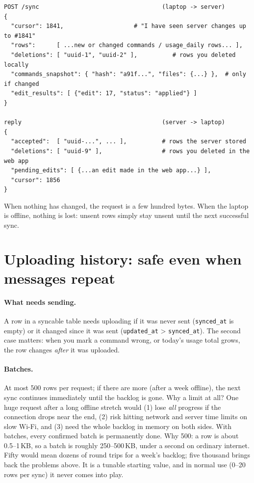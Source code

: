 \documentclass[11pt,a4paper]{article}
\begin{document}
\begin{lstlisting}
POST /sync                                   (laptop -> server)
{
  "cursor": 1841,                    # "I have seen server changes up to #1841"
  "rows":      [ ...new or changed commands / usage_daily rows... ],
  "deletions": [ "uuid-1", "uuid-2" ],          # rows you deleted locally
  "commands_snapshot": { "hash": "a91f...", "files": {...} },  # only if changed
  "edit_results": [ {"edit": 17, "status": "applied"} ]
}

reply                                        (server -> laptop)
{
  "accepted":  [ "uuid-...", ... ],          # rows the server stored
  "deletions": [ "uuid-9" ],                 # rows you deleted in the web app
  "pending_edits": [ {...an edit made in the web app...} ],
  "cursor": 1856
}
\end{lstlisting}

\noindent When nothing has changed, the request is a few hundred bytes. When the laptop is
offline, nothing is lost: unsent rows simply stay unsent until the next successful sync.

\section{Uploading history: safe even when messages repeat}

\paragraph{What needs sending.} A row in a syncable table needs uploading if it was never
sent (\texttt{synced\_at} is empty) or it changed since it was sent
(\texttt{updated\_at} \textgreater{} \texttt{synced\_at}). The second case matters: when you mark
a command wrong, or today's usage total grows, the row changes \emph{after} it was uploaded.

\paragraph{Batches.} At most 500 rows per request; if there are more (after a week offline),
the next sync continues immediately until the backlog is gone. Why a limit at all? One huge
request after a long offline stretch would (1) lose \emph{all} progress if the connection drops
near the end, (2) risk hitting network and server time limits on slow Wi-Fi, and (3) need the
whole backlog in memory on both sides. With batches, every confirmed batch is permanently done.
Why 500: a row is about 0.5--1\,KB, so a batch is roughly 250--500\,KB, under a second on
ordinary internet. Fifty would mean dozens of round trips for a week's backlog; five thousand
brings back the problems above. It is a tunable starting value, and in normal use (0--20 rows
per sync) it never comes into play.
\end{document}
